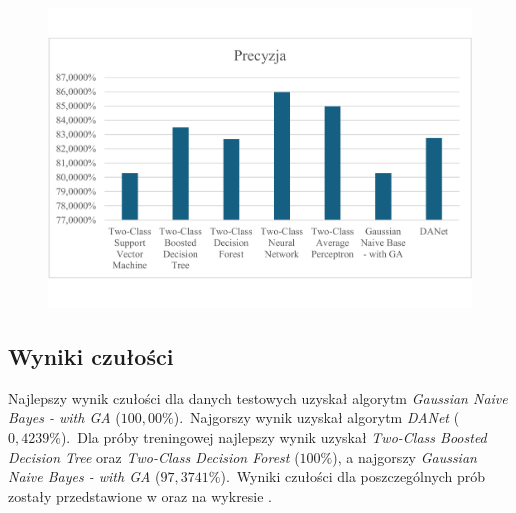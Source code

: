 \begin{figure}[H]
    \centering
    \includegraphics[width=\textwidth]{images/prec-res}
    \label{fig:prec-res}
\end{figure}

\subsection{Wyniki czułości}
Najlepszy wynik czułości dla danych testowych uzyskał algorytm \textit{Gaussian Naive Bayes - with GA} ($100,00\%$).\ Najgorszy wynik uzyskał algorytm \textit{DANet} ($0,4239\%$).\ Dla próby treningowej najlepszy wynik uzyskał \textit{Two-Class Boosted Decision Tree} oraz \textit{Two-Class Decision Forest} ($100\%$), a najgorszy \textit{Gaussian Naive Bayes - with GA} ($97,3741\%$).\ Wyniki czułości dla poszczególnych prób zostały przedstawione w  oraz na wykresie .

